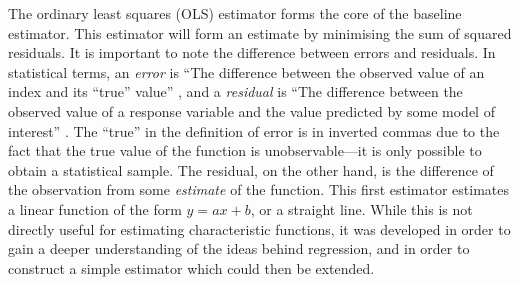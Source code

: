 \documentclass[a4paper,11pt]{article}
\begin{document}
    The ordinary least squares (OLS) estimator forms the core of the baseline
    estimator. This estimator will form an estimate by minimising the sum of squared
    residuals. It is important to note the difference between errors and
    residuals. In statistical terms, an \emph{error} is ``The difference between the
    observed value of an index and its ``true'' value'' \cite{2008oecd}, and a
    \emph{residual} is ``The difference between the observed value of a response
    variable and the value predicted by some model of interest''
    \cite{everitt2010cambridge}. The ``true'' in the definition of error is in
    inverted commas due to the fact that the true value of the function is
    unobservable---it is only possible to obtain a statistical sample. The residual,
    on the other hand, is the difference of the observation from some
    \emph{estimate} of the function. This first estimator estimates a linear
    function of the form $y=ax+b$, or a straight line. While this is not directly
    useful for estimating characteristic functions, it was developed in order to
    gain a deeper understanding of the ideas behind regression, and in order to
    construct a simple estimator which could then be extended.
\end{document}
